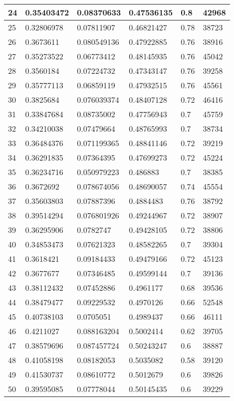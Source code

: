 \begin{longtable}{|l|l|l|l|l|l|}
24 & 0.35403472 & 0.08370633 & 0.47536135 & 0.8 & 42968 \\ \hline 
25 & 0.32806978 & 0.07811907 & 0.46821427 & 0.78 & 38723 \\ \hline 
26 & 0.3673611 & 0.080549136 & 0.47922885 & 0.76 & 38916 \\ \hline 
27 & 0.35273522 & 0.06773412 & 0.48145935 & 0.76 & 45042 \\ \hline 
28 & 0.3560184 & 0.07224732 & 0.47343147 & 0.76 & 39258 \\ \hline 
29 & 0.35777113 & 0.06859119 & 0.47932515 & 0.76 & 45561 \\ \hline 
30 & 0.3825684 & 0.076039374 & 0.48407128 & 0.72 & 46416 \\ \hline 
31 & 0.33847684 & 0.08735002 & 0.47756943 & 0.7 & 45759 \\ \hline 
32 & 0.34210038 & 0.07479664 & 0.48765993 & 0.7 & 38734 \\ \hline 
33 & 0.36484376 & 0.071199365 & 0.48841146 & 0.72 & 39219 \\ \hline 
34 & 0.36291835 & 0.07364395 & 0.47699273 & 0.72 & 45224 \\ \hline 
35 & 0.36234716 & 0.050979223 & 0.486883 & 0.7 & 38385 \\ \hline 
36 & 0.3672692 & 0.078674056 & 0.48690057 & 0.74 & 45554 \\ \hline 
37 & 0.35603803 & 0.07887396 & 0.4884483 & 0.76 & 38792 \\ \hline 
38 & 0.39514294 & 0.076801926 & 0.49244967 & 0.72 & 38907 \\ \hline 
39 & 0.36295906 & 0.0782747 & 0.49428105 & 0.72 & 38806 \\ \hline 
40 & 0.34853473 & 0.07621323 & 0.48582265 & 0.7 & 39304 \\ \hline 
41 & 0.3618421 & 0.09184433 & 0.49479166 & 0.72 & 45123 \\ \hline 
42 & 0.3677677 & 0.07346485 & 0.49599144 & 0.7 & 39136 \\ \hline 
43 & 0.38112432 & 0.07452886 & 0.4961177 & 0.68 & 39536 \\ \hline 
44 & 0.38479477 & 0.09229532 & 0.4970126 & 0.66 & 52548 \\ \hline 
45 & 0.40738103 & 0.0705051 & 0.4989437 & 0.66 & 46111 \\ \hline 
46 & 0.4211027 & 0.088163204 & 0.5002414 & 0.62 & 39705 \\ \hline 
47 & 0.38579696 & 0.087457724 & 0.50243247 & 0.6 & 38887 \\ \hline 
48 & 0.41058198 & 0.08182053 & 0.5035082 & 0.58 & 39120 \\ \hline 
49 & 0.41530737 & 0.08610772 & 0.5012679 & 0.6 & 39826 \\ \hline 
50 & 0.39595085 & 0.07778044 & 0.50145435 & 0.6 & 39229 \\ \hline 
\end{longtable}